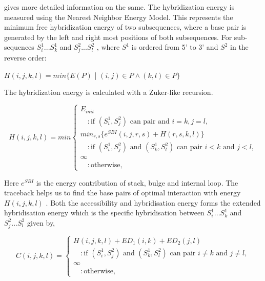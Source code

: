 \documentclass[twoside,a4paper]{report}
\begin{document}
	\citet{muckstein2006thermodynamics} gives more detailed information on the same.
	The hybridization energy is measured using the Nearest Neighbor Energy Model. This represents the minimum free hybridization energy  of two subsequences, where a base pair is generated by the left and right most positions of both subsequences.
	For sub-sequences $S_i^1...S_k^1$ and  $S_j^2...S_l^2$ , where $S^1$ is ordered from 5' to 3' and $S^2$ in the reverse order:

	
		\begin{center}
		
		$H(i,j,k,l) = min \{ E(P)$ | $(i, j) \in P \land (k,l) \in P \}$
		
	\end{center}
	
	The hybridization energy is calculated with a Zuker-like recursion.
	
	\begin{equation}
	H(i,j,k,l) = min \begin{cases}
	E_{init} \\
		\quad : \text{if $(S_i^1 , S_j^2 )$ can pair and $i =k , j=l $}, \\	
	min_{r,s}\{ e^{SBI}(i,j,r,s)+ H(r,s,k,l)\} \\
	 \quad 	: \text{if $(S_i^1 , S_j^2 )$ and $(S_k^1 , S_l^2)$ can pair $i < k $ and $j < l $} ,\\
	\infty \\
	\quad : \text{otherwise},
	\end{cases}
	\end{equation}
	
	Here $e^{SBI} $ is the energy contribution of stack, bulge and internal loop. The traceback helps us to find the base pairs of optimal interaction with energy $H(i,j,k,l)$ . Both the accessibility and hybridisation energy forms the extended hybridisation energy which is the specific hybridisation between $S_i^1...S_k^1$ and  $S_j^2...S_l^2$ given by, 
	
		\begin{equation}
	C(i,j,k,l) =  \begin{cases}
	H(i, j, k , l) + ED_1(i, k) + ED_2(j, l) \\
	\quad 	: \text{if $(S_i^1 , S_j^2 )$ and $(S_k^1 , S_l^2)$ can pair $i \neq k $ and $j \neq l $} ,\\
	\infty \\
	\quad : \text{otherwise},
	\end{cases}
	\end{equation}
	
\end{document}
